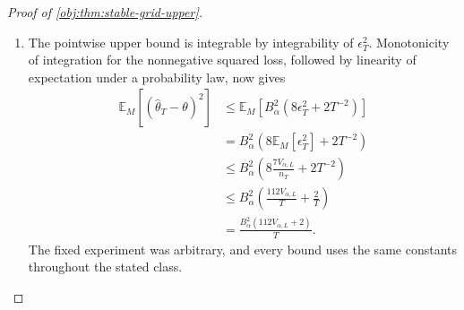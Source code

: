 \begin{proof}[Proof of \cref{obj:thm:stable-grid-upper}]
\begin{enumerate}
\item The pointwise upper bound is integrable by integrability of \(\epsilon_T^2\). Monotonicity of integration for the nonnegative squared loss, followed by linearity of expectation under a probability law, now gives
\[
\begin{aligned}
\mathbb E_M[(\widehat\theta_T-\theta)^2]
&\le
\mathbb E_M\!\left[
 B_\alpha^2(8\epsilon_T^2+2T^{-2})
\right]\\
&=
B_\alpha^2\left(8\mathbb E_M[\epsilon_T^2]+2T^{-2}\right)\\
&\le
B_\alpha^2\left(
 8\frac{7V_{\alpha,L}}{n_T}+2T^{-2}
\right)\\
&\le
B_\alpha^2\left(
 \frac{112V_{\alpha,L}}T+\frac2T
\right)\\
&=
\frac{B_\alpha^2(112V_{\alpha,L}+2)}T.
\end{aligned}
\]
The fixed experiment was arbitrary, and every bound uses the same constants throughout the stated class.
\end{enumerate}
\end{proof}

